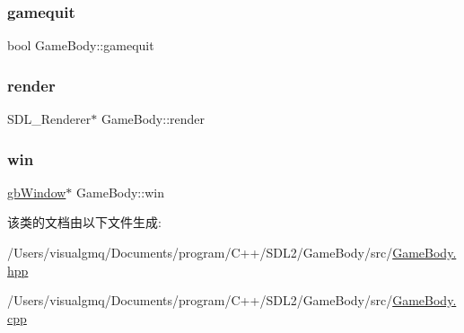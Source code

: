 \mbox{\label{class_game_body_ae2777759c863e6610b0aa90888c99b95}} 
\subsubsection{\texorpdfstring{gamequit}{gamequit}}
{\footnotesize\ttfamily bool Game\+Body\+::gamequit\hspace{0.3cm}{\ttfamily [protected]}}

\mbox{\label{class_game_body_a7325fa39af4c769a643b9bc5805a0e28}} 
\subsubsection{\texorpdfstring{render}{render}}
{\footnotesize\ttfamily S\+D\+L\+\_\+\+Renderer$\ast$ Game\+Body\+::render\hspace{0.3cm}{\ttfamily [protected]}}

\mbox{\label{class_game_body_a66e2f55c012e92d4723a08a642722777}} 
\subsubsection{\texorpdfstring{win}{win}}
{\footnotesize\ttfamily \mbox{\hyperlink{classgb_window}{gb\+Window}}$\ast$ Game\+Body\+::win\hspace{0.3cm}{\ttfamily [protected]}}



该类的文档由以下文件生成\+:\begin{DoxyCompactItemize}
\item 
/\+Users/visualgmq/\+Documents/program/\+C++/\+S\+D\+L2/\+Game\+Body/src/\mbox{\hyperlink{_game_body_8hpp}{Game\+Body.\+hpp}}\item 
/\+Users/visualgmq/\+Documents/program/\+C++/\+S\+D\+L2/\+Game\+Body/src/\mbox{\hyperlink{_game_body_8cpp}{Game\+Body.\+cpp}}\end{DoxyCompactItemize}
